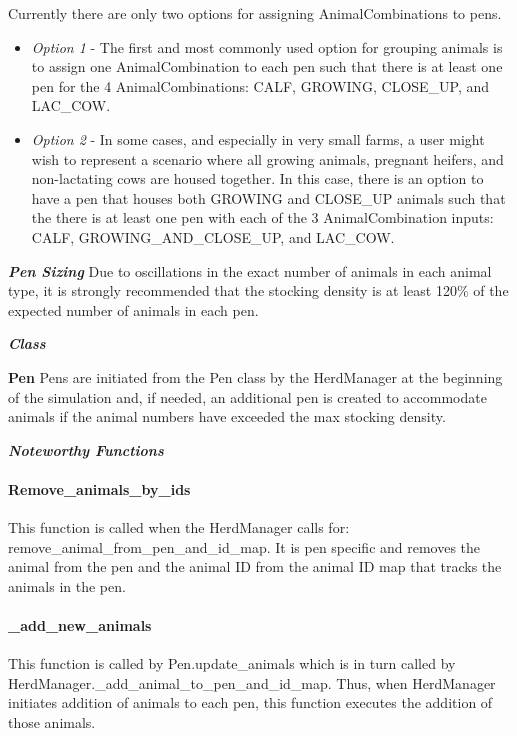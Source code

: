 \begin{refsection}
 
 Currently there are only two options for assigning AnimalCombinations to pens. 
\vspace{0.2cm}
\begin{itemize}
    \item \textit{Option 1} - The first and most commonly used option for grouping animals is to assign one AnimalCombination to each pen such that there is at least one pen for the 4 AnimalCombinations: CALF, GROWING, CLOSE\_UP, and LAC\_COW. 
    \item \textit{Option 2} - In some cases, and especially in very small farms, a user might wish to represent a scenario where all growing animals, pregnant heifers, and non-lactating cows are housed together. In this case, there is an option to have a pen that houses both GROWING and CLOSE\_UP animals such that the there is at least one pen with each of the 3 AnimalCombination inputs: CALF, GROWING\_AND\_CLOSE\_UP, and LAC\_COW. 
\end{itemize}


    \textbf{\textit{Pen Sizing}} Due to oscillations in the exact number of animals in each animal type, it is strongly recommended that the stocking density is at least 120\% of the expected number of animals in each pen. 
    \vspace{0.2cm}
    
    \textbf{\textit{Class}} 
    \vspace{0.2cm}
    
    \textbf{Pen}
    Pens are initiated from the Pen class by the HerdManager at the beginning of the simulation and, if needed, an additional pen is created to accommodate animals if the animal numbers have exceeded the max stocking density. 

    \textbf{\textit{Noteworthy Functions}} 
    \vspace{0.2cm}
    
    \paragraph{Remove\_animals\_by\_ids} This function is called when the HerdManager calls for: remove\_animal\_from\_pen\_and\_id\_map. It is pen specific and removes the animal from the pen and the animal ID from the animal ID map that tracks the animals in the pen. 


    \paragraph{\_add\_new\_animals}This function is called by Pen.update\_animals which is in turn called by HerdManager.\_add\_animal\_to\_pen\_and\_id\_map. Thus, when HerdManager initiates addition of animals to each pen, this function executes the addition of those animals. 


\end{refsection}
